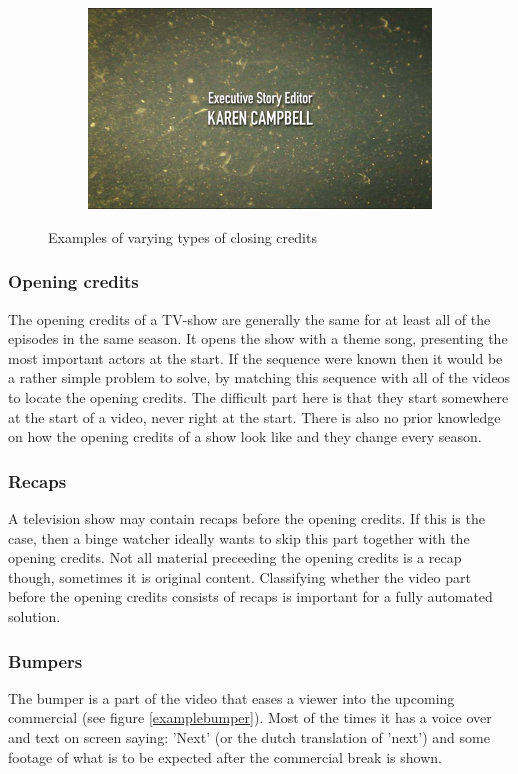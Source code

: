 \documentclass{article}
\begin{document}
\begin{figure}[H]
\begin{subfigure}[b]{0.4\textwidth}
\end{subfigure}
\begin{subfigure}[b]{0.4\textwidth}
	\includegraphics[width=\textwidth]{images/diffcredits2.png}
\end{subfigure}
  \caption{Examples of varying types of closing credits}
  \label{fig:closingcredits}
\end{figure}

\subsubsection{Opening credits}
The opening credits of a TV-show are generally the same for at least all of the episodes in the same season. It opens the show with a theme song, presenting the most important actors at the start. If the sequence were known then it would be a rather simple problem to solve, by matching this sequence with all of the videos to locate the opening credits. The difficult part here is that they start somewhere at the start of a video, never right at the start. There is also no prior knowledge on how the opening credits of a show look like and they change every season.

\subsubsection{Recaps}
A television show may contain recaps before the opening credits. If this is the case, then a binge watcher ideally wants to skip this part together with the opening credits. Not all material preceeding the opening credits is a recap though, sometimes it is original content. Classifying whether the video part before the opening credits consists of recaps is important for a fully automated solution.

\subsubsection{Bumpers}
The bumper is a part of the video that eases a viewer into the upcoming commercial (see figure \ref{examplebumper}). Most of the times it has a voice over and text on screen saying: 'Next' (or the dutch translation of 'next') and some footage of what is to be expected after the commercial break is shown.
\end{document}
